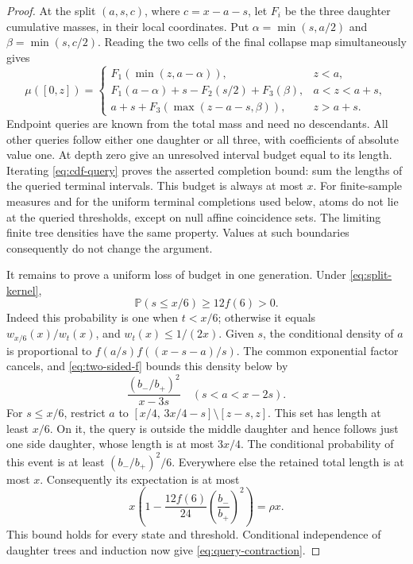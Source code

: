 \documentclass[11pt,letterpaper]{article}
\newcommand{\PP}{\mathbb P}\newcommand{\EE}{\mathbb E}
\begin{document}
\begin{proof}
At the split $(a,s,c)$, where $c=x-a-s$, let $F_i$ be the three daughter
cumulative masses, in their local coordinates. Put
$\alpha=\min(s,a/2)$ and $\beta=\min(s,c/2)$. Reading the two cells of
the final collapse map simultaneously gives
\begin{equation}\label{eq:cdf-query}
 \mu([0,z])=
 \begin{cases}
 F_1(\min(z,a-\alpha)),&z<a,\\
 F_1(a-\alpha)+s-F_2(s/2)+F_3(\beta),&a<z<a+s,\\
 a+s+F_3(\max(z-a-s,\beta)),&z>a+s.
 \end{cases}
\end{equation}
Endpoint queries are known from the total mass and need no descendants.
All other queries follow either one daughter or all three, with
coefficients of absolute value one. At depth zero give an unresolved
interval budget equal to its length. Iterating \eqref{eq:cdf-query}
proves the asserted completion bound: sum the lengths of the queried
terminal intervals. This budget is always at most $x$.
For finite-sample measures and for the uniform terminal completions used
below, atoms do not lie at the queried thresholds, except on null affine
coincidence sets. The limiting finite tree densities have the same
property. Values at such boundaries consequently do not change the
argument.

It remains to prove a uniform loss of budget in one generation.
Under \eqref{eq:split-kernel},
\[
 \PP(s\le x/6)\ge12f(6)>0.
\]
Indeed this probability is one when $t<x/6$; otherwise it equals
$w_{x/6}(x)/w_t(x)$, and $w_t(x)\le1/(2x)$.
Given $s$, the conditional density of $a$ is proportional to
$f(a/s)f((x-s-a)/s)$. The common exponential factor cancels, and
\eqref{eq:two-sided-f} bounds this density below by
\[
 \frac{(b_-/b_+)^2}{x-3s}\quad(s<a<x-2s).
\]
For $s\le x/6$, restrict $a$ to
$[x/4,\,3x/4-s]\setminus[z-s,z]$.
This set has length at least $x/6$. On it, the query is outside the
middle daughter and hence follows just one side daughter, whose length
is at most $3x/4$. The conditional probability of this event is at
least $(b_-/b_+)^2/6$. Everywhere else the retained total length is at
most $x$. Consequently its expectation is at most
\[
 x\left(1-\frac{12f(6)}{24}
                     \left(\frac{b_-}{b_+}\right)^2\right)=\rho x.
\]
This bound holds for every state and threshold. Conditional independence
of daughter trees and induction now give \eqref{eq:query-contraction}.
\end{proof}
\end{document}
